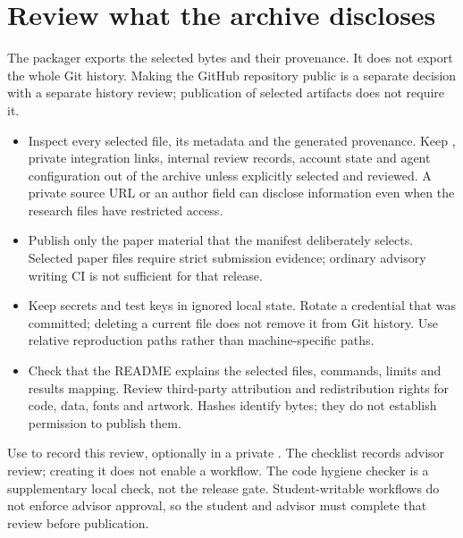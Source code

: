 \section{Review what the archive discloses}\label{guide:zenodo:public}
The packager exports the selected bytes and their provenance. It does not export the whole Git history. Making the GitHub repository public is a separate decision with a separate history review; publication of selected artifacts does not require it.
\begin{itemize}
  \item Inspect every selected file, its metadata and the generated provenance. Keep , private integration links, internal review records, account state and agent configuration out of the archive unless explicitly selected and reviewed. A private source URL or an author field can disclose information even when the research files have restricted access.
  \item Publish only the paper material that the manifest deliberately selects. Selected paper files require strict submission evidence; ordinary advisory writing CI is not sufficient for that release.
  \item Keep secrets and test keys in ignored local state. Rotate a credential that was committed; deleting a current file does not remove it from Git history. Use relative reproduction paths rather than machine-specific paths.
  \item Check that the README explains the selected files, commands, limits and results mapping. Review third-party attribution and redistribution rights for code, data, fonts and artwork. Hashes identify bytes; they do not establish permission to publish them.
\end{itemize}
Use  to record this review, optionally in a private . The checklist records advisor review; creating it does not enable a workflow. The code hygiene checker is a supplementary local check, not the release gate. Student-writable workflows do not enforce advisor approval, so the student and advisor must complete that review before publication.


